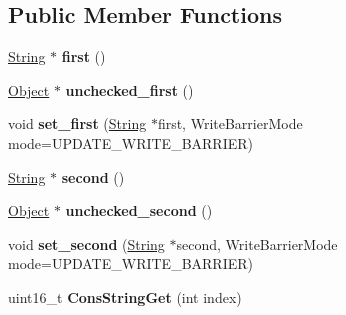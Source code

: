 \subsection*{Public Member Functions}
\begin{DoxyCompactItemize}
\item 
\hypertarget{classv8_1_1internal_1_1_cons_string_ab6540b105bc383ade7c48f8cc12d2339}{}\hyperlink{classv8_1_1internal_1_1_string}{String} $\ast$ {\bfseries first} ()\label{classv8_1_1internal_1_1_cons_string_ab6540b105bc383ade7c48f8cc12d2339}

\item 
\hypertarget{classv8_1_1internal_1_1_cons_string_ac2ec1588574736752932d69bedf1d050}{}\hyperlink{classv8_1_1internal_1_1_object}{Object} $\ast$ {\bfseries unchecked\+\_\+first} ()\label{classv8_1_1internal_1_1_cons_string_ac2ec1588574736752932d69bedf1d050}

\item 
\hypertarget{classv8_1_1internal_1_1_cons_string_a457af0dfca59a313e41d7d630612337b}{}void {\bfseries set\+\_\+first} (\hyperlink{classv8_1_1internal_1_1_string}{String} $\ast$first, Write\+Barrier\+Mode mode=U\+P\+D\+A\+T\+E\+\_\+\+W\+R\+I\+T\+E\+\_\+\+B\+A\+R\+R\+I\+E\+R)\label{classv8_1_1internal_1_1_cons_string_a457af0dfca59a313e41d7d630612337b}

\item 
\hypertarget{classv8_1_1internal_1_1_cons_string_a9d0134684950323df6720beab31f6ad4}{}\hyperlink{classv8_1_1internal_1_1_string}{String} $\ast$ {\bfseries second} ()\label{classv8_1_1internal_1_1_cons_string_a9d0134684950323df6720beab31f6ad4}

\item 
\hypertarget{classv8_1_1internal_1_1_cons_string_a68c3b0092484be42ba7681d62a5ede12}{}\hyperlink{classv8_1_1internal_1_1_object}{Object} $\ast$ {\bfseries unchecked\+\_\+second} ()\label{classv8_1_1internal_1_1_cons_string_a68c3b0092484be42ba7681d62a5ede12}

\item 
\hypertarget{classv8_1_1internal_1_1_cons_string_ade98aa98d6128c06586734a67c164d41}{}void {\bfseries set\+\_\+second} (\hyperlink{classv8_1_1internal_1_1_string}{String} $\ast$second, Write\+Barrier\+Mode mode=U\+P\+D\+A\+T\+E\+\_\+\+W\+R\+I\+T\+E\+\_\+\+B\+A\+R\+R\+I\+E\+R)\label{classv8_1_1internal_1_1_cons_string_ade98aa98d6128c06586734a67c164d41}

\item 
\hypertarget{classv8_1_1internal_1_1_cons_string_a4599e754c6c77c4f814f5d53246e78b0}{}uint16\+\_\+t {\bfseries Cons\+String\+Get} (int index)\label{classv8_1_1internal_1_1_cons_string_a4599e754c6c77c4f814f5d53246e78b0}

\end{DoxyCompactItemize}
